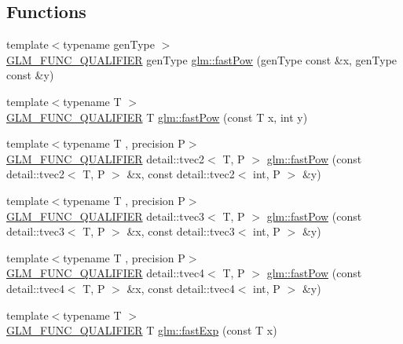 \subsection*{Functions}
\begin{DoxyCompactItemize}
\item 
{\footnotesize template$<$typename gen\+Type $>$ }\\\hyperlink{setup_8hpp_a33fdea6f91c5f834105f7415e2a64407}{G\+L\+M\+\_\+\+F\+U\+N\+C\+\_\+\+Q\+U\+A\+L\+I\+F\+I\+ER} gen\+Type \hyperlink{group__gtx__fast__exponential_ga842ec5e981c76f8aae7ae14972795378}{glm\+::fast\+Pow} (gen\+Type const \&x, gen\+Type const \&y)
\item 
{\footnotesize template$<$typename T $>$ }\\\hyperlink{setup_8hpp_a33fdea6f91c5f834105f7415e2a64407}{G\+L\+M\+\_\+\+F\+U\+N\+C\+\_\+\+Q\+U\+A\+L\+I\+F\+I\+ER} T \hyperlink{namespaceglm_a2aaec425ec510772b4611f75b9b5f67b}{glm\+::fast\+Pow} (const T x, int y)
\item 
{\footnotesize template$<$typename T , precision P$>$ }\\\hyperlink{setup_8hpp_a33fdea6f91c5f834105f7415e2a64407}{G\+L\+M\+\_\+\+F\+U\+N\+C\+\_\+\+Q\+U\+A\+L\+I\+F\+I\+ER} detail\+::tvec2$<$ T, P $>$ \hyperlink{namespaceglm_a91a0f63bf5d10bb64f4f50df7a102d14}{glm\+::fast\+Pow} (const detail\+::tvec2$<$ T, P $>$ \&x, const detail\+::tvec2$<$ int, P $>$ \&y)
\item 
{\footnotesize template$<$typename T , precision P$>$ }\\\hyperlink{setup_8hpp_a33fdea6f91c5f834105f7415e2a64407}{G\+L\+M\+\_\+\+F\+U\+N\+C\+\_\+\+Q\+U\+A\+L\+I\+F\+I\+ER} detail\+::tvec3$<$ T, P $>$ \hyperlink{namespaceglm_a82f246b4681436e1a32c28e5e967f48d}{glm\+::fast\+Pow} (const detail\+::tvec3$<$ T, P $>$ \&x, const detail\+::tvec3$<$ int, P $>$ \&y)
\item 
{\footnotesize template$<$typename T , precision P$>$ }\\\hyperlink{setup_8hpp_a33fdea6f91c5f834105f7415e2a64407}{G\+L\+M\+\_\+\+F\+U\+N\+C\+\_\+\+Q\+U\+A\+L\+I\+F\+I\+ER} detail\+::tvec4$<$ T, P $>$ \hyperlink{namespaceglm_a63ff761e1385c85dcf82e75628710e3e}{glm\+::fast\+Pow} (const detail\+::tvec4$<$ T, P $>$ \&x, const detail\+::tvec4$<$ int, P $>$ \&y)
\item 
{\footnotesize template$<$typename T $>$ }\\\hyperlink{setup_8hpp_a33fdea6f91c5f834105f7415e2a64407}{G\+L\+M\+\_\+\+F\+U\+N\+C\+\_\+\+Q\+U\+A\+L\+I\+F\+I\+ER} T \hyperlink{namespaceglm_ae74f5cf7dd2cf7bd620d0e715ce57c05}{glm\+::fast\+Exp} (const T x)

\end{DoxyCompactItemize}

